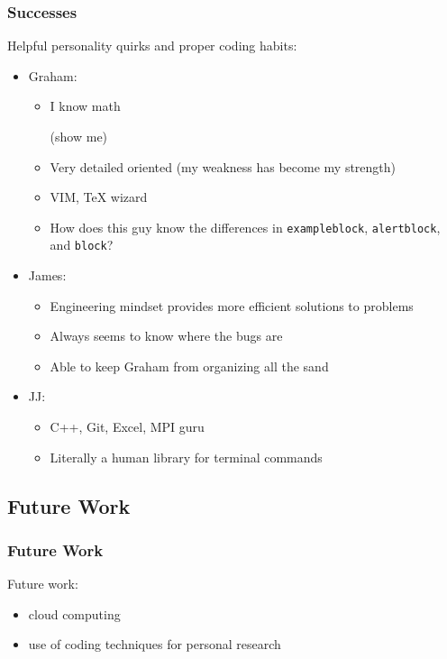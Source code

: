 \documentclass[usernames,dvipsnames]{beamer}
\begin{document}
\begin{frame}	
	\frametitle{Successes}
	
	\begin{exampleblock}{Helpful personality quirks and proper coding habits:}
		\begin{itemize}
			\setlength\itemsep{0.5pt}
			\item Graham: \\ \vspace{-5pt}
				\begin{itemize}
					\setlength\itemsep{0.5pt}
					\item I know math \begin{tiny}(show me)\end{tiny}
					\item Very detailed oriented (my weakness has become my strength)
					\item VIM, TeX wizard
					\item How does this guy know the differences in \texttt{exampleblock}, \texttt{alertblock}, and \texttt{block}? \vspace{-5pt}
				\end{itemize}
			\item James: \\ \vspace{-5pt}
				\begin{itemize}
					\setlength\itemsep{0.5pt}
					\item Engineering mindset provides more efficient solutions to problems
					\item Always seems to know where the bugs are
					\item Able to keep Graham from organizing all the sand \vspace{-5pt}
				\end{itemize}
			\item JJ: \\ \vspace{-5pt}
				\begin{itemize}
					\setlength\itemsep{0.5pt}
					\item C++, Git, Excel, MPI guru
					\item Literally a human library for terminal commands
				\end{itemize}
		\end{itemize}
	\end{exampleblock}

\end{frame}

\subsection{Future Work}

\begin{frame}	
	\frametitle{Future Work}
	
	\begin{block}{Future work:}
		\begin{itemize}
			\item cloud computing
			\item use of coding techniques for personal research
		\end{itemize}
	\end{block}
	
\end{frame}




 
\end{document}
